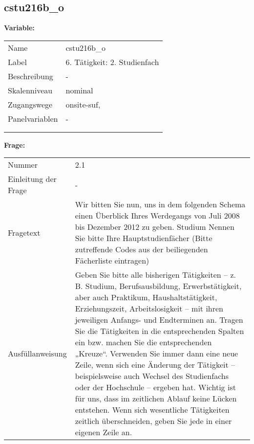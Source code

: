 	
	
	\subsection{cstu216b\_o}
	\label{subSection:cstu216b_o}

	\noindent\textbf{Variable:}\\
		\begin{tabular}{lL{11.3cm}}
			\label{tableVariable:cstu216b_o}
			Name & cstu216b\_o \\
			Label & 6. Tätigkeit: 2. Studienfach \\
			Beschreibung & - \\
			Skalenniveau & nominal \\
			Zugangswege &
				onsite-suf,
 \\
			Panelvariablen & -
			 \\
			 \\
 \\
		\end{tabular}

		\vspace*{1 cm}
		\noindent\textbf{Frage:}\\
		\begin{tabular}{lL{11.3cm}}
			\label{tableQuestion:cstu216b_o}
			Nummer & 2.1 \\
			Einleitung der Frage & - \\
			Fragetext & Wir bitten Sie nun, uns in dem folgenden Schema einen Überblick Ihres Werdegangs von Juli 2008 bis Dezember 2012 zu geben.
Studium
Nennen Sie bitte Ihre Hauptstudienfächer
(Bitte zutreffende Codes aus der beiliegenden Fächerliste eintragen) \\
			Ausfüllanweisung & Geben Sie bitte alle bisherigen Tätigkeiten – z. B. Studium, Berufsausbildung, Erwerbstätigkeit, aber auch Praktikum, Haushaltstätigkeit,
Erziehungszeit, Arbeitslosigkeit – mit ihren jeweiligen Anfangs- und Endterminen an. Tragen Sie die Tätigkeiten in die entsprechenden Spalten ein bzw. machen Sie die entsprechenden „Kreuze“. Verwenden Sie immer dann eine neue Zeile, wenn sich eine Änderung der Tätigkeit – beispielsweise auch Wechsel des Studienfachs oder der Hochschule – ergeben hat. Wichtig ist für uns, dass im zeitlichen Ablauf keine Lücken entstehen. Wenn sich wesentliche Tätigkeiten zeitlich überschneiden, geben Sie jede in einer eigenen Zeile an. \\
		\end{tabular}





